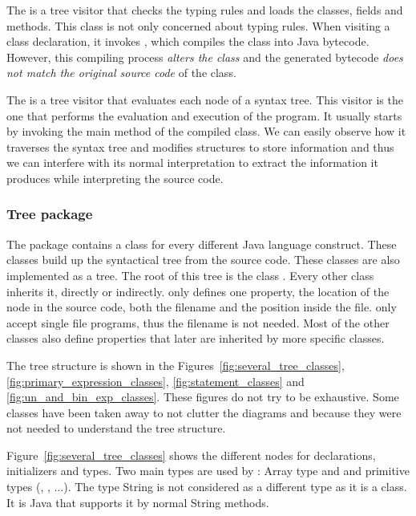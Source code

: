 The  is a tree visitor that checks the typing rules and loads the classes, fields and methods. This  class is not only concerned about typing rules. When visiting a class declaration, it invokes , which compiles the class into Java bytecode. However, this compiling process \textit{alters the class} and the generated bytecode \textit{does not match the original source code} of the class.

The  is a tree visitor that evaluates each node of a syntax tree. This visitor is the one that performs the evaluation and execution of the program. It usually starts by invoking the main method of the compiled class. We can easily observe how it traverses the syntax tree and modifies \djava{} structures to store information and thus we can interfere with its normal interpretation to extract the information it produces while interpreting the source code.

\subsubsection{Tree package}
\label{sec:Tree_package}

The  package contains a class for every different Java language construct. These classes build up the syntactical tree from the source code. These classes are also implemented as a
tree. The root of this tree is the class . Every other class inherits it, directly or indirectly.  only defines one property, the location of the node in the source code, both the filename and the position inside the file. \jel{} only accept single file programs, thus the filename is not needed. Most of the other classes also define properties that later are inherited by more specific classes.

The tree structure is shown in the Figures~\ref{fig:several_tree_classes}, \ref{fig:primary_expression_classes}, \ref{fig:statement_classes} and \ref{fig:un_and_bin_exp_classes}. These figures do not try to be exhaustive. Some classes have been taken away to not clutter the diagrams and because they were not needed to understand the
tree structure.

Figure~\ref{fig:several_tree_classes} shows the different nodes for declarations, initializers and types. Two main types are used by \djava{}: Array type and and primitive types (, , ...). The type String is not considered as a different type as it is a class. It is Java that supports it by normal String methods.

